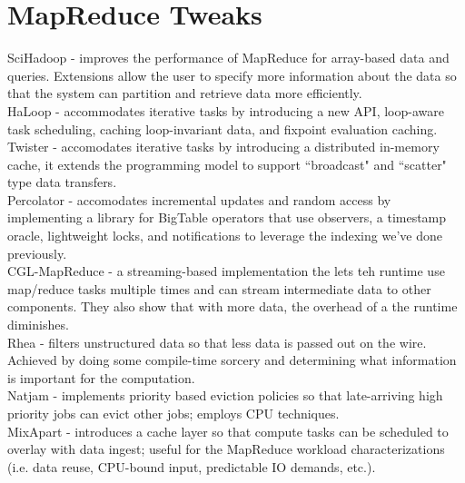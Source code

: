 \documentclass{article}
\begin{document}
\section{MapReduce Tweaks}

\noindent\cite{buck:hpc2011-scihadoop} SciHadoop - improves the performance of MapReduce for array-based data and queries. Extensions allow the user to specify more information about the data so that the system can partition and retrieve data more efficiently.\\

\noindent\cite{bu:vldb2010-haloop} HaLoop - accommodates iterative tasks by introducing a new API, loop-aware task scheduling, caching loop-invariant data, and fixpoint evaluation caching.\\

\noindent\cite{ekanayake:hpdc2010-twister} Twister - accomodates iterative tasks by introducing a distributed in-memory cache, it extends the programming model to support ``broadcast" and ``scatter" type data transfers.\\

\noindent\cite{peng:osdi2010-percolator} Percolator - accomodates incremental updates and random access by implementing a library for BigTable operators that use observers, a timestamp oracle, lightweight locks, and notifications to leverage the indexing we've done previously.\\

\noindent\cite{ekanayake:escience2008-eglmapreduce} CGL-MapReduce - a streaming-based implementation the lets teh runtime use map/reduce tasks multiple times and can stream intermediate data to other components. They also show that with more data, the overhead of a the runtime diminishes.\\ 

\noindent\cite{gkantsidis:nsdi2013-rhea} Rhea - filters unstructured data so that less data is passed out on the wire. Achieved by doing some compile-time sorcery and determining what information is important for the computation.\\

\noindent\cite{cho:socc2013-natjam} Natjam - implements priority based eviction policies so that late-arriving high priority jobs can evict other jobs; employs CPU techniques.\\

\noindent\cite{mihailescu:hotstorage2012-mixapart} MixApart - introduces a cache layer so that compute tasks can be scheduled to overlay with data ingest; useful for the MapReduce workload characterizations (i.e. data reuse, CPU-bound input, predictable IO demands, etc.).\\
\end{document}
